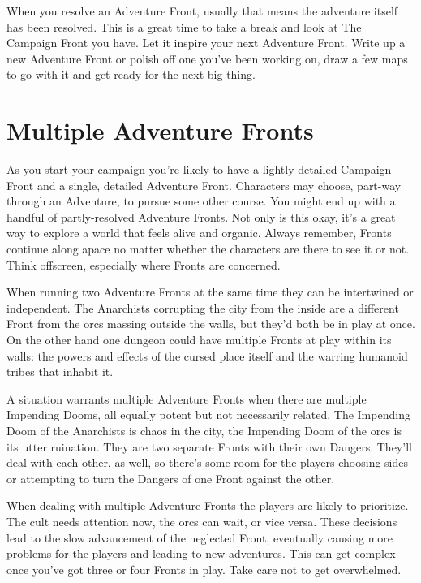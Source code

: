  

When you resolve an Adventure Front, usually that means the adventure itself has been resolved. This is a great time to take a break and look at The Campaign Front you have. Let it inspire your next Adventure Front. Write up a new Adventure Front or polish off one you’ve been working on, draw a few maps to go with it and get ready for the next big thing.

 
\section{Multiple Adventure Fronts}     
 

As you start your campaign you're likely to have a lightly-detailed Campaign Front and a single, detailed Adventure Front. Characters may choose, part-way through an Adventure, to pursue some other course. You might end up with a handful of partly-resolved Adventure Fronts. Not only is this okay, it's a great way to explore a world that feels alive and organic. Always remember, Fronts continue along apace no matter whether the characters are there to see it or not. Think offscreen, especially where Fronts are concerned.

 

When running two Adventure Fronts at the same time they can be intertwined or independent. The Anarchists corrupting the city from the inside are a different Front from the orcs massing outside the walls, but they'd both be in play at once. On the other hand one dungeon could have multiple Fronts at play within its walls: the powers and effects of the cursed place itself and the warring humanoid tribes that inhabit it.

 

A situation warrants multiple Adventure Fronts when there are multiple Impending Dooms, all equally potent but not necessarily related. The Impending Doom of the Anarchists is chaos in the city, the Impending Doom of the orcs is its utter ruination. They are two separate Fronts with their own Dangers. They'll deal with each other, as well, so there's some room for the players choosing sides or attempting to turn the Dangers of one Front against the other.

 

When dealing with multiple Adventure Fronts the players are likely to prioritize. The cult needs attention now, the orcs can wait, or vice versa. These decisions lead to the slow advancement of the neglected Front, eventually causing more problems for the players and leading to new adventures. This can get complex once you've got three or four Fronts in play. Take care not to get overwhelmed.

 
